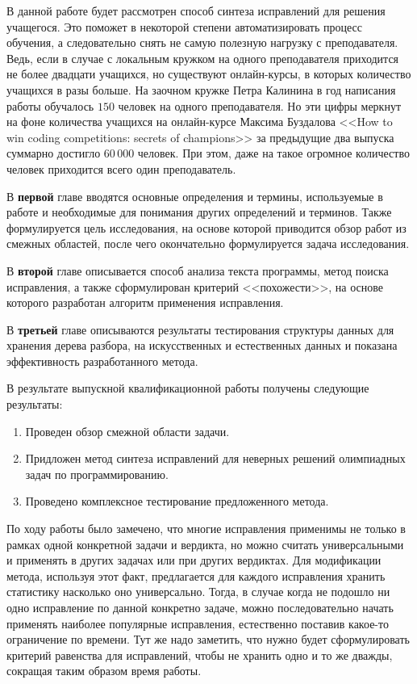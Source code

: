 \documentclass[times,specification,annotation]{itmo-student-thesis}
\begin{document}
В данной работе будет рассмотрен способ синтеза исправлений для решения учащегося. Это поможет в некоторой
степени автоматизировать процесс обучения, а следовательно снять не самую полезную нагрузку с преподавателя.
Ведь, если в случае с локальным кружком на одного преподавателя приходится не более двадцати учащихся, но существуют
онлайн-курсы, в которых количество учащихся в разы больше. На заочном кружке Петра Калинина в год написания работы
обучалось $150$ человек на одного преподавателя. Но эти цифры меркнут на фоне количества учащихся на онлайн-курсе 
Максима Буздалова <<How to win coding competitions: secrets of champions>> за предыдущие два выпуска суммарно достигло 
$60\,000$ человек. При этом, даже на такое огромное количество человек приходится всего один преподаватель.

В \textbf{первой} главе вводятся основные определения и термины, используемые в работе и необходимые
для понимания других определений и терминов. Также формулируется цель исследования, на основе которой
приводится обзор работ из смежных областей, после чего окончательно формулируется задача исследования.

В \textbf{второй} главе описывается способ анализа текста программы, метод поиска исправления, а также
сформулирован критерий <<похожести>>, на основе которого разработан алгоритм применения исправления.

В \textbf{третьей} главе описываются результаты тестирования структуры данных для хранения дерева разбора,
на искусственных и естественных данных и показана эффективность разработанного метода.






\startconclusionpage

В результате выпускной квалификационной работы получены следующие результаты:
\begin{enumerate}
    \item Проведен обзор смежной области задачи.
    \item Придложен метод синтеза исправлений для неверных решений олимпиадных задач по программированию.
    \item Проведено комплексное тестирование предложенного метода.
\end{enumerate}

По ходу работы было замечено, что многие исправления применимы не только в рамках одной конкретной задачи и вердикта,
но можно считать универсальными и применять в других задачах или при других вердиктах. Для модификации метода, используя
этот факт, предлагается для каждого исправления хранить статистику насколько оно универсально. Тогда, в случае когда
не подошло ни одно исправление по данной конкретно задаче, можно последовательно начать применять наиболее популярные исправления,
естественно поставив какое-то ограничение по времени. Тут же надо заметить, что нужно будет сформулировать критерий равенства
для исправлений, чтобы не хранить одно и то же дважды, сокращая таким образом время работы. 
\end{document}
